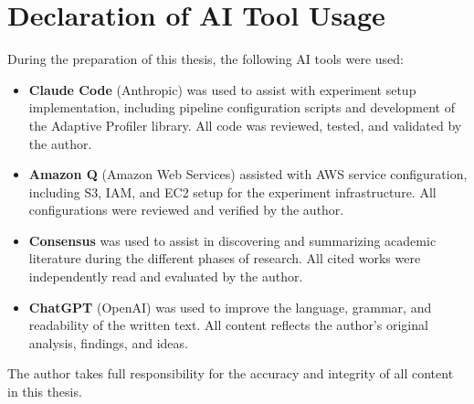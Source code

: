 \documentclass[12pt]{article}
\begin{document}
\section*{Declaration of AI Tool Usage}
During the preparation of this thesis, the following AI tools were used:
\begin{itemize}
  \item \textbf{Claude Code} (Anthropic) was used to assist with experiment
  setup implementation, including pipeline configuration scripts and development
  of the Adaptive Profiler library. All code was reviewed, tested, and validated
  by the author.
  \item \textbf{Amazon Q} (Amazon Web Services) assisted with AWS service
  configuration, including S3, IAM, and EC2 setup for the experiment
  infrastructure. All configurations were reviewed and verified by the author.
  \item \textbf{Consensus} was used to assist in discovering and summarizing
  academic literature during the different phases of research. All cited works were
  independently read and evaluated by the author.
  \item \textbf{ChatGPT} (OpenAI) was used to improve the language, grammar,
  and readability of the written text. All content reflects the author's original
  analysis, findings, and ideas.
\end{itemize}
The author takes full responsibility for the accuracy and integrity of all content
in this thesis.



\end{document}
